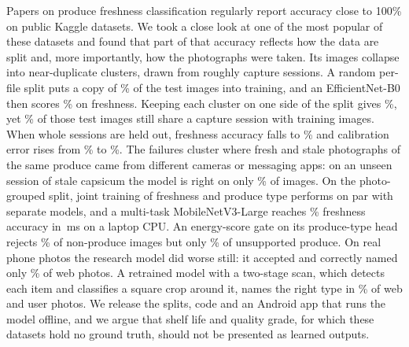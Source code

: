 Papers on produce freshness classification regularly report accuracy close to
100\% on public Kaggle datasets. We took a close look at one of the most popular
of these datasets and found that part of that accuracy reflects how the data are
split and, more importantly, how the photographs were taken. Its \NImages{}
images collapse into \NGroups{} near-duplicate clusters, drawn from roughly
\NSessions{} capture sessions. A random per-file split puts a copy of
\NaiveLeakPct\% of the test images into training, and an EfficientNet-B0 then
scores \NaiveFreshAcc\% on freshness. Keeping each cluster on one side of the
split gives \MtlFreshAcc\%, yet \SessionSharePct\% of those test images still
share a capture session with training images. When whole sessions are held out,
freshness accuracy falls to \SessFreshAcc\% and calibration error rises from
\MtlFreshEce\% to \SessFreshEce\%. The failures cluster where fresh and stale
photographs of the same produce came from different cameras or messaging apps:
on an unseen session of stale capsicum the model is right on only
\SessHeldCapsicumStale\% of images. On the photo-grouped split, joint training
of freshness and produce type performs on par with separate models, and a
multi-task MobileNetV3-Large reaches \MnvFreshAcc\% freshness accuracy in
\MnvCpuMs\,ms on a laptop CPU. An energy-score gate on its produce-type head
rejects \MnvGateFarOODRejectRate\% of non-produce images but only
\MnvGateNearOODRejectRate\% of unsupported produce. On real phone photos the
research model did worse still: it accepted and correctly named only
\ResWebAccCorr\% of \WebN{} web photos. A retrained model with a two-stage scan,
which detects each item and classifies a square crop around it, names the right
type in \ScanWebDet\% of web and user photos.
We release the splits, code
and an Android app that runs the model offline, and we argue that shelf life
and quality grade, for which these datasets hold no ground truth, should not be
presented as learned outputs.
